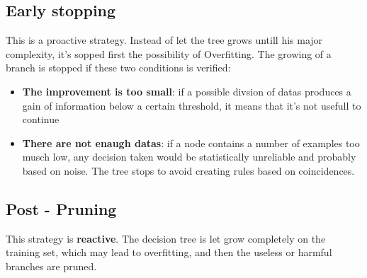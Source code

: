 \subsection{Early stopping}
This is a proactive strategy. Instead of let the tree grows untill his major complexity, it's sopped first the possibility of Overfitting. The growing of a branch is stopped if these two conditions is verified:
\begin{itemize}
    \item \textbf{The improvement is too small}: if a possible divsion of datas produces a gain of information below a certain threshold, it means that it's not usefull to continue
    \item \textbf{There are not enaugh datas}: if a node contains a number of examples too musch low, any decision taken would be statistically unreliable and probably based on noise. The tree stops to avoid creating rules based on coincidences.
\end{itemize}
\subsection{Post - Pruning}
This strategy is \textbf{reactive}. 
The decision tree is let grow completely on the training set, 
which may lead to overfitting, 
and then the useless or harmful branches are pruned.


